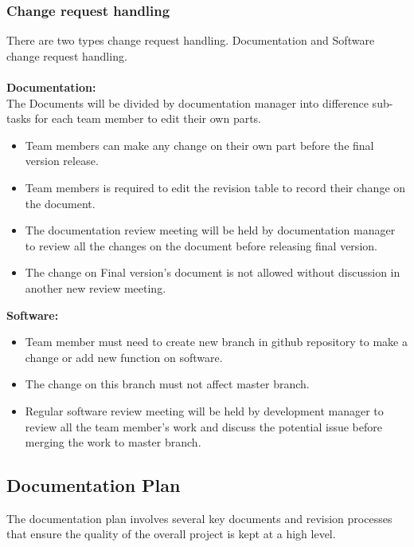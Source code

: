 \subsubsection{Change request handling}
There are two types change request handling. Documentation and Software change request handling.\\\\
\textbf{Documentation:}\\
The Documents will be divided by documentation manager into difference sub-tasks for each team member to edit their own parts. 
\begin{itemize}
\item Team members can make any change on their own part before the final version release. 

\item Team members is required to edit the revision table to record their change on the document. 

\item The documentation review meeting will be held by documentation manager to review all the changes on the document before releasing final version.

\item The change on Final version's document is not allowed without discussion in another new review meeting. 
\end{itemize}
\textbf{Software:}
\begin{itemize}
\item Team member must need to create new branch in github repository to make a change or add new function on software. 
\item The change on this branch must not affect master branch.
\item Regular software review meeting will be held by development manager to review all the team member’s work and discuss the potential issue before merging the work to master branch.
\end{itemize}

\newpage


\subsection{Documentation Plan}
The documentation plan involves several key documents and revision processes that ensure the quality of the overall project is kept at a high level.

